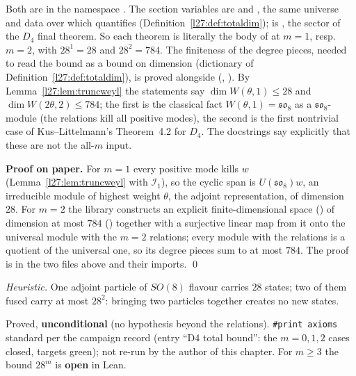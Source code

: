 \begin{dictionary}
Both are in the namespace . The section variables are
 and , the same universe and
data over which  quantifies (Definition~\ref{l27:def:totaldim});  is
, the sector of the $D_4$ final theorem. So each theorem is literally the body of
 at $m=1$, resp.\ $m=2$, with $28^1=28$ and $28^2=784$. The finiteness of the degree pieces, needed to
read the bound as a bound on dimension (dictionary of Definition~\ref{l27:def:totaldim}), is proved alongside
(, ). By Lemma~\ref{l27:lem:truncweyl} the statements say
$\dim W(\theta,1)\le28$ and $\dim W(2\theta,2)\le784$; the first is the classical fact $W(\theta,1)=\mathfrak{so}_8$ as a
$\mathfrak{so}_8$-module (the relations kill all positive modes), the second is the first nontrivial case of Kus--Littelmann's
Theorem~4.2 for $D_4$. The docstrings say explicitly that these are not the all-$m$ input.
\end{dictionary}

\textbf{Proof on paper.} For $m=1$ every positive mode kills $w$ (Lemma~\ref{l27:lem:truncweyl} with $\mathcal I_1$), so the
cyclic span is $U(\mathfrak{so}_8)w$, an irreducible module of highest weight $\theta$, the adjoint representation, of dimension
$28$. For $m=2$ the library constructs an explicit finite-dimensional space () of dimension at most $784$
() together with a surjective linear map from it onto the universal module with the $m=2$ relations; every module
with the relations is a quotient of the universal one, so its degree pieces sum to at most $784$. The proof is in the two files above
and their imports. \qed

\begin{physics}
\emph{Heuristic.} One adjoint particle of $SO(8)$ flavour carries $28$ states; two of them fused carry at most $28^2$: bringing two
particles together creates no new states.
\end{physics}

\begin{status}
Proved, \textbf{unconditional} (no hypothesis beyond the relations). \texttt{\#print axioms} standard per the campaign record
(entry ``D4 total bound'': the $m=0,1,2$ cases closed, targets green); not re-run by the author of this chapter.
For $m\ge3$ the bound $28^m$ is \textbf{open} in Lean.
\end{status}

